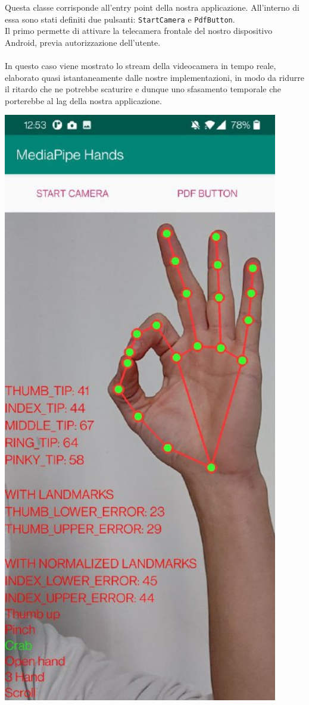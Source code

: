 \begin{multicols}{2}
\noindent Questa classe corrisponde all'entry point della nostra applicazione. All'interno di essa sono stati definiti due pulsanti: \texttt{StartCamera} e \texttt{PdfButton}.\\
Il primo permette di attivare la telecamera frontale 
del nostro dispositivo Android, previa autorizzazione dell'utente.\\
\\
\noindent In questo caso viene mostrato lo 
stream della videocamera in tempo reale, elaborato quasi istantaneamente dalle nostre 
implementazioni, in modo da ridurre il ritardo che ne potrebbe scaturire e dunque uno sfasamento 
temporale che porterebbe al lag della nostra applicazione.
    \columnbreak
    \begin{multicolfigure}
        \centering
        \includegraphics[width=0.9\textwidth]{images/startcamera.png}

\end{multicolfigure}
\end{multicols}
